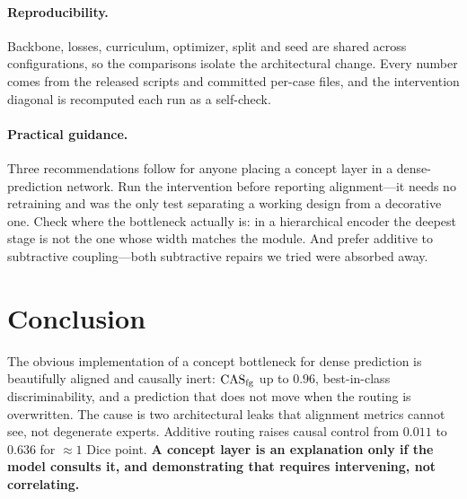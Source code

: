 \paragraph{Reproducibility.}
Backbone, losses, curriculum, optimizer, split and seed are shared across configurations, so the
comparisons isolate the architectural change. Every number comes from the released scripts and
committed per-case files, and the intervention diagonal is recomputed each run as a self-check.

\paragraph{Practical guidance.}
Three recommendations follow for anyone placing a concept layer in a dense-prediction network.
Run the intervention before reporting alignment---it needs no retraining and was the only test
separating a working design from a decorative one. Check where the bottleneck actually is: in a
hierarchical encoder the deepest stage is not the one whose width matches the module. And prefer
additive to subtractive coupling---both subtractive repairs we tried were absorbed away.

\section{Conclusion}
The obvious implementation of a concept bottleneck for dense prediction is beautifully aligned and
causally inert: $\mathrm{CAS}_{\mathrm{fg}}$ up to $0.96$, best-in-class discriminability, and a prediction that does
not move when the routing is overwritten. The cause is two architectural leaks that alignment
metrics cannot see, not degenerate experts. Additive routing raises causal control from $0.011$ to
$0.636$ for ${\approx}1$ Dice point. \textbf{A concept layer is an explanation only if the model
consults it, and demonstrating that requires intervening, not correlating.}
